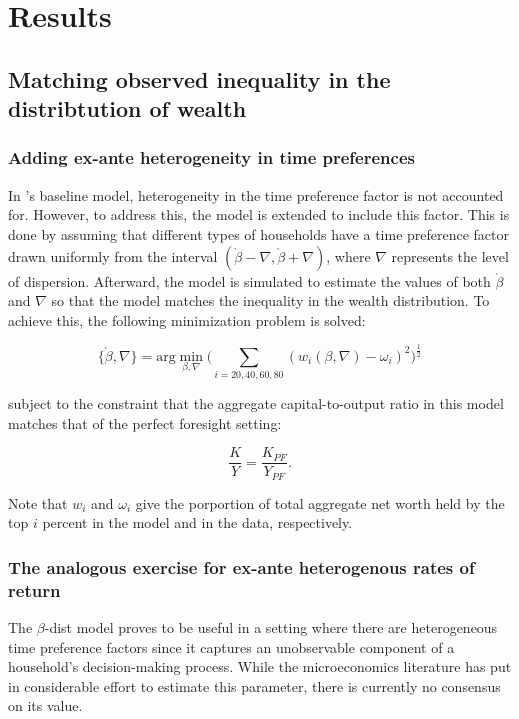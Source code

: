 
\section{Results}\notinsubfile{\label{sec:results}}

\subsection{Matching observed inequality in the distribtution of wealth}

\subsubsection{Adding ex-ante heterogeneity in time preferences}

\par In \cite{cstw2017}'s baseline model, heterogeneity in the time preference factor is not accounted for. However, to address this, the model is extended to include this factor. This is done by assuming that different types of households have a time preference factor drawn uniformly from the interval $(\grave{\beta} - \nabla, \grave{\beta} + \nabla)$, where $\nabla$ represents the level of dispersion. Afterward, the model is simulated to estimate the values of both $\grave{\beta}$ and $\nabla$ so that the model matches the inequality in the wealth distribution. To achieve this, the following minimization problem is solved:

$$ \{\grave{\beta}, \nabla\} = \text{arg}\min_{\beta, \nabla} \bigg( \sum_{i=20, 40, 60, 80} (w_{i}(\beta, \nabla)-\omega_i )^{2} \bigg)^{\frac{1}{2}} $$

\par subject to the constraint that the aggregate capital-to-output ratio in this model matches that of the perfect foresight setting:

$$ \frac{K}{Y} = \frac{K_{PF}}{Y_{PF}}. $$

\par Note that $w_i$ and $\omega_i$ give the porportion of total aggregate net worth held by the top $i$ percent in the model and in the data, respectively.

\subsubsection{The analogous exercise for ex-ante heterogenous rates of return}

\par The $\beta$-dist model proves to be useful in a setting where there are heterogeneous time preference factors since it captures an unobservable component of a household's decision-making process. While the microeconomics literature has put in considerable effort to estimate this parameter, there is currently no consensus on its value.

